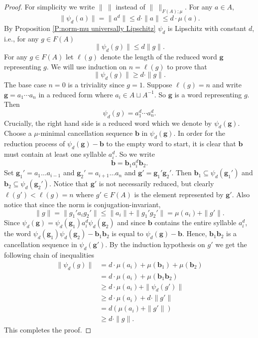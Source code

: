 \documentclass[12pt]{amsart}
\theoremstyle{definition}
\newcommand{\B}[1]{\mathbf{#1}}
\def\Free{F}
\begin{document}
\begin{proof}
For simplicity we write $\| \ \|$ instead of $\| \ \|_{F(A);\mu}$.
For any $a \in A$,
\[
\| \psi_d(a)\| = \| a^d\| \leq d \cdot \|a\| \leq d \cdot \mu(a).
\]
By Proposition \ref{P:norm-mu universally Lipschitz} $\psi_d$ is Lipschitz with constant $d$, i.e., for any $g \in \Free(A)$
\[
\| \psi_d(g)\| \leq d \|g\|.
\]
For any $g \in \Free(A)$ let $\ell(g)$ denote the length of the reduced word $\B g$ representing $g$.
We will use induction on $n=\ell(g)$ to prove that 
$$
\|\psi_d(g)\| \geq d \cdot \|g\|.
$$
The base case $n=0$ is a triviality since $g=1$.
Suppose $\ell(g)=n$ and write $\B g = a_1 \cdots a_n$ in a reduced form where $a_i \in A \sqcup A^{-1}$.
So $\B g$ is a word representing $g$.
Then 
\[
\psi_d(g) = a_1^d \cdots a_n^d.
\]
Crucially, the right hand side is a reduced word which we denote by $\psi_d(\B g)$.
Choose a $\mu$-minimal cancellation sequence $\B b$ in $\psi_d(\B g)$.
In order for the reduction process of $\psi_d(\B g) - \B b$ to the empty word to start, it is clear that $\B b$ must contain at least one syllable $a_i^d$.
So we write
\[
\B b = \B b_1 a_i^d \B b_2.
\]
Set $\B g_1'=a_1 \dots a_{i-1}$ and $\B g_2'=a_{i+1} \dots a_n$ and  $\B g'=\B g_1' \B g_2'$.
Then $\B b_1 \subseteq \psi_d(\B g_1')$ and $\B b_2 \subseteq \psi_d(\B g_2')$.
Notice that $\B g'$ is not necessarily reduced, but clearly $\ell(g') < \ell(g)=n$ where $g' \in \Free(A)$ is the element represented by $\B g'$.
Also notice that since the norm is conjugation-invariant, 
\[
\| g \| = 
\| g_1' a_i g_2'\| \leq 
\|a_i\|+\| g_1'  g_2'\| 
= \mu(a_i) + \| g'\|.
\]
Since $\psi_d(\B g)=\psi_d(\B g_1)a_i^d\psi_d(\B g_2)$ and since $\B b$ contains the entire syllable $a_i^d$, the word $\psi_d(\B g_1)\psi_d(\B g_2)- \B b_1\B b_2$ is equal to $\psi_d(\B g) - \B b$.
Hence, $\B b_1 \B b_2$ is a cancellation sequence in $\psi_d(\B g')$.
By the induction hypothesis on $g'$ we get the following chain of inequalities
\begin{align*}
\| \psi_d(g)\| &= d \cdot \mu(a_i)+\mu(\B b_1)+\mu(\B b_2)\\
&=d \cdot \mu(a_i)+\mu(\B b_1\B b_2)\\
&\geq d \cdot \mu(a_i) + \|\psi_d(g')\|\\
&\geq  d \cdot \mu(a_i)+d \cdot \| g'\|\\
&= d(\mu(a_i)+\|g'\|)\\ 
&\geq d \cdot \|g\|.
\end{align*}
This completes the proof.
\end{proof}
\end{document}
